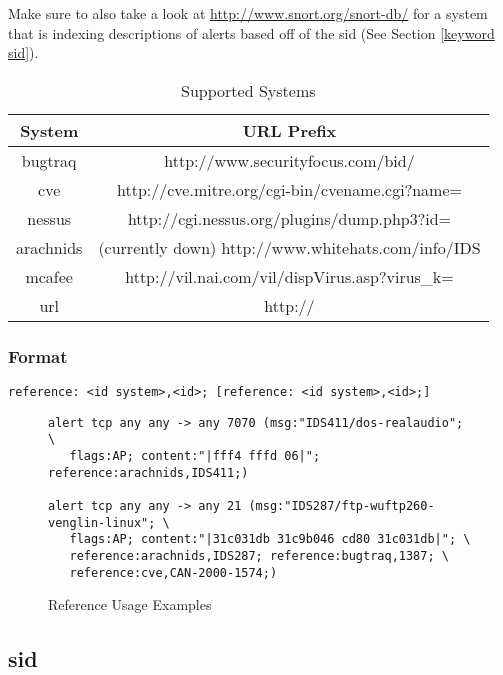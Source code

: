 \documentclass[english]{report}
\begin{document}
Make sure to also take a look at \url{http://www.snort.org/snort-db/}
for a system that is indexing descriptions of alerts based off of
the sid (See Section \ref{keyword sid}).
\begin{table}[!hbpt]

\caption{Supported Systems \label{references systems}}

\begin{center}\begin{tabular}{|c|c|}
\hline 
System&
URL Prefix\\
\hline
\hline 
bugtraq&
http://www.securityfocus.com/bid/\\
\hline 
cve&
http://cve.mitre.org/cgi-bin/cvename.cgi?name=\\
\hline 
nessus &
http://cgi.nessus.org/plugins/dump.php3?id=\\
\hline 
arachnids&
(currently down) http://www.whitehats.com/info/IDS\\
\hline 
mcafee&
http://vil.nai.com/vil/dispVirus.asp?virus\_k=\\
\hline 
url&
http://\\
\hline
\end{tabular}\end{center}
\end{table}


\subsubsection{Format}

\begin{verbatim}
reference: <id system>,<id>; [reference: <id system>,<id>;]
\end{verbatim}

\begin{figure}[!hbpt]
\begin{verbatim}
alert tcp any any -> any 7070 (msg:"IDS411/dos-realaudio"; \
   flags:AP; content:"|fff4 fffd 06|"; reference:arachnids,IDS411;)

alert tcp any any -> any 21 (msg:"IDS287/ftp-wuftp260-venglin-linux"; \
   flags:AP; content:"|31c031db 31c9b046 cd80 31c031db|"; \
   reference:arachnids,IDS287; reference:bugtraq,1387; \
   reference:cve,CAN-2000-1574;)
\end{verbatim}

\caption{Reference Usage Examples\label{example reference rule}}
\end{figure}

\subsection{sid\label{keyword sid}}
\end{document}
